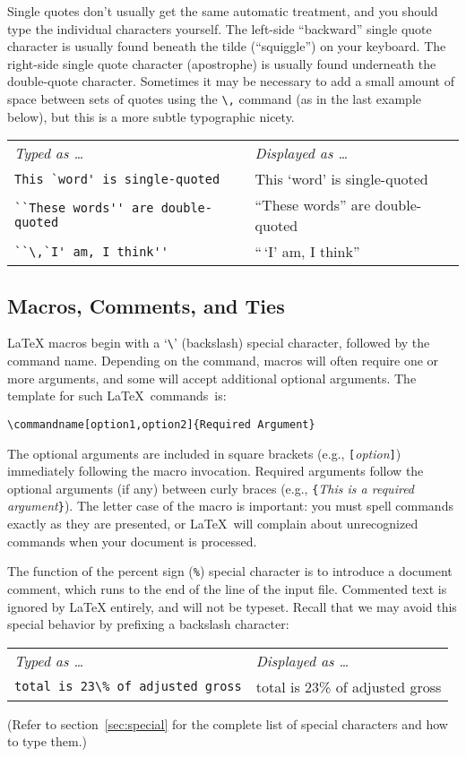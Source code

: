 \documentclass[11pt,letterpaper]{ltxdockit}[2011/03/25]
\renewcommand{\-}{\discretionary{}{}{}}
\begin{document}
Single quotes don't usually get the same automatic treatment, and you
should type the individual characters yourself.  The left-side
``backward'' single quote character is usually found beneath the tilde
(``squiggle'') on your keyboard.  The right-side single quote
character (apostrophe) is usually found underneath the double-quote
character.  Sometimes it may be necessary to add a small amount of
space between sets of quotes using the \verb|\,| command (as in the
last example below), but this is a more subtle typographic nicety.
\begin{center}
\begin{tabular}{l l}
\textit{Typed as \ldots}&\textit{Displayed as \ldots}\\[3pt]
\verb|This `word' is single-quoted| & This `word' is single-quoted \\
\verb|``These words'' are double-quoted| & ``These words'' are double-quoted \\
\verb|``\,`I' am, I think''| & ``\,`I' am, I think''\\
\end{tabular}
\end{center}

\subsection{Macros, Comments, and Ties}
\label{sec:comments}
\LaTeX{} macros begin with a `\verb+\+' (backslash) special character,
followed by the command name.  Depending on the command,
macros will often require
one or more arguments, and some will accept additional optional
arguments.  The template for such \LaTeX\ commands~is:
\begin{verbatim}
\commandname[option1,option2]{Required Argument}
\end{verbatim}
The optional arguments are included in square brackets (e.g.,
\verb+[+\textit{option}\verb+]+) immediately following the macro
invocation.  Required arguments follow the optional arguments (if any)
between curly braces (e.g., \verb+{+\textit{This is a required
  argument}\verb+}+).  The letter case of the macro is important:
you must spell commands exactly as they are presented, or \LaTeX\ will
complain about unrecognized commands when your document is processed.

The function of the percent sign (\verb|%|) special character is to
introduce a document comment, which runs to the end of
the line of the input file.  Commented text is ignored by \LaTeX{}
entirely, and will not be typeset.  Recall that we may avoid this
special behavior by prefixing a backslash character:
\begin{center}
\begin{tabular}{l l}
\textit{Typed as \ldots}&\textit{Displayed as \ldots}\\[3pt]
\verb|total is 23\% of adjusted gross|&
total is 23\% of adjusted gross\\
\end{tabular}
\end{center}
(Refer to section~\ref{sec:special} for the complete list of special
characters and how to type them.)
\end{document}
